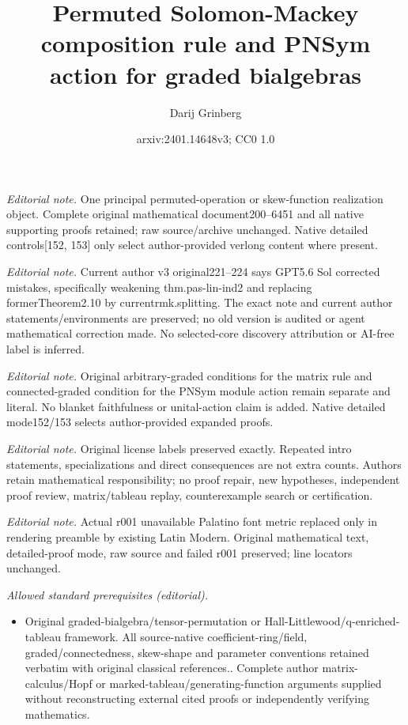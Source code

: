 \documentclass[numbers=enddot,12pt,final,onecolumn,notitlepage]{scrartcl}%
\title{Permuted Solomon-Mackey composition rule and PNSym action for graded bialgebras}
\author{Darij Grinberg}
\date{arxiv:2401.14648v3; CC0 1.0}
\theoremstyle{definition}
\begin{document}
\maketitle
\noindent\textit{Editorial note.} One principal permuted-operation or skew-function realization object. Complete original mathematical document200--6451 and all native supporting proofs retained; raw source/archive unchanged. Native detailed controls[152, 153] only select author-provided verlong content where present.\par\medskip
\noindent\textit{Editorial note.} Current author v3 original221--224 says GPT5.6 Sol corrected mistakes, specifically weakening thm.pas-lin-ind2 and replacing formerTheorem2.10 by currentrmk.splitting. The exact note and current author statements/environments are preserved; no old version is audited or agent mathematical correction made. No selected-core discovery attribution or AI-free label is inferred.\par\medskip
\noindent\textit{Editorial note.} Original arbitrary-graded conditions for the matrix rule and connected-graded condition for the PNSym module action remain separate and literal. No blanket faithfulness or unital-action claim is added. Native detailed mode152/153 selects author-provided expanded proofs.\par\medskip
\noindent\textit{Editorial note.} Original license labels preserved exactly. Repeated intro statements, specializations and direct consequences are not extra counts. Authors retain mathematical responsibility; no proof repair, new hypotheses, independent proof review, matrix/tableau replay, counterexample search or certification.\par\medskip
\noindent\textit{Editorial note.} Actual r001 unavailable Palatino font metric replaced only in rendering preamble by existing Latin Modern. Original mathematical text, detailed-proof mode, raw source and failed r001 preserved; line locators unchanged.\par\medskip
\noindent\textit{Allowed standard prerequisites (editorial).}\begin{itemize}
\item Original graded-bialgebra/tensor-permutation or Hall-Littlewood/q-enriched-tableau framework. All source-native coefficient-ring/field, graded/connectedness, skew-shape and parameter conventions retained verbatim with original classical references.. Complete author matrix-calculus/Hopf or marked-tableau/generating-function arguments supplied without reconstructing external cited proofs or independently verifying mathematics.
\end{itemize}\medskip
\end{document}
